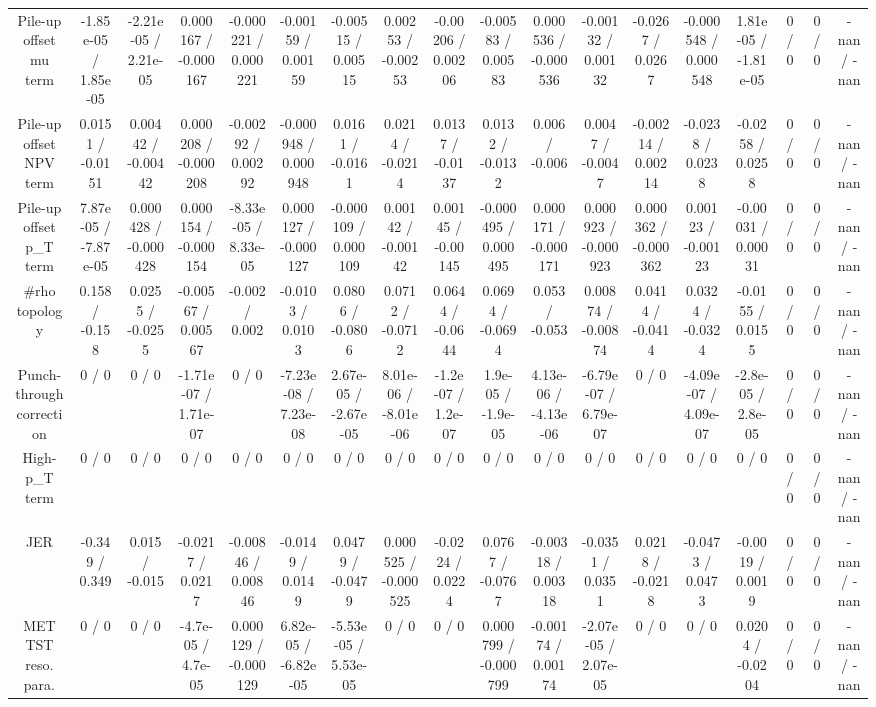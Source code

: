 \documentclass[10pt]{article}
\begin{document}
\begin{table}[htbp]
\begin{center}
\begin{tabular}{|c|c|c|c|c|c|c|c|c|c|c|c|c|c|c|c|c|c|}
  Pile-up offset mu term & -1.85e-05 / 1.85e-05 & -2.21e-05 / 2.21e-05 & 0.000167 / -0.000167 & -0.000221 / 0.000221 & -0.00159 / 0.00159 & -0.00515 / 0.00515 & 0.00253 / -0.00253 & -0.00206 / 0.00206 & -0.00583 / 0.00583 & 0.000536 / -0.000536 & -0.00132 / 0.00132 & -0.0267 / 0.0267 & -0.000548 / 0.000548 & 1.81e-05 / -1.81e-05 & 0 / 0 & 0 / 0 & -nan / -nan \\ 
  Pile-up offset NPV term & 0.0151 / -0.0151 & 0.00442 / -0.00442 & 0.000208 / -0.000208 & -0.00292 / 0.00292 & -0.000948 / 0.000948 & 0.0161 / -0.0161 & 0.0214 / -0.0214 & 0.0137 / -0.0137 & 0.0132 / -0.0132 & 0.006 / -0.006 & 0.0047 / -0.0047 & -0.00214 / 0.00214 & -0.0238 / 0.0238 & -0.0258 / 0.0258 & 0 / 0 & 0 / 0 & -nan / -nan \\ 
  Pile-up offset p_{T} term & 7.87e-05 / -7.87e-05 & 0.000428 / -0.000428 & 0.000154 / -0.000154 & -8.33e-05 / 8.33e-05 & 0.000127 / -0.000127 & -0.000109 / 0.000109 & 0.00142 / -0.00142 & 0.00145 / -0.00145 & -0.000495 / 0.000495 & 0.000171 / -0.000171 & 0.000923 / -0.000923 & 0.000362 / -0.000362 & 0.00123 / -0.00123 & -0.00031 / 0.00031 & 0 / 0 & 0 / 0 & -nan / -nan \\ 
  #rho topology & 0.158 / -0.158 & 0.0255 / -0.0255 & -0.00567 / 0.00567 & -0.002 / 0.002 & -0.0103 / 0.0103 & 0.0806 / -0.0806 & 0.0712 / -0.0712 & 0.0644 / -0.0644 & 0.0694 / -0.0694 & 0.053 / -0.053 & 0.00874 / -0.00874 & 0.0414 / -0.0414 & 0.0324 / -0.0324 & -0.0155 / 0.0155 & 0 / 0 & 0 / 0 & -nan / -nan \\ 
  Punch-through correction & 0 / 0 & 0 / 0 & -1.71e-07 / 1.71e-07 & 0 / 0 & -7.23e-08 / 7.23e-08 & 2.67e-05 / -2.67e-05 & 8.01e-06 / -8.01e-06 & -1.2e-07 / 1.2e-07 & 1.9e-05 / -1.9e-05 & 4.13e-06 / -4.13e-06 & -6.79e-07 / 6.79e-07 & 0 / 0 & -4.09e-07 / 4.09e-07 & -2.8e-05 / 2.8e-05 & 0 / 0 & 0 / 0 & -nan / -nan \\ 
  High-p_{T} term & 0 / 0 & 0 / 0 & 0 / 0 & 0 / 0 & 0 / 0 & 0 / 0 & 0 / 0 & 0 / 0 & 0 / 0 & 0 / 0 & 0 / 0 & 0 / 0 & 0 / 0 & 0 / 0 & 0 / 0 & 0 / 0 & -nan / -nan \\ 
  JER & -0.349 / 0.349 & 0.015 / -0.015 & -0.0217 / 0.0217 & -0.00846 / 0.00846 & -0.0149 / 0.0149 & 0.0479 / -0.0479 & 0.000525 / -0.000525 & -0.0224 / 0.0224 & 0.0767 / -0.0767 & -0.00318 / 0.00318 & -0.0351 / 0.0351 & 0.0218 / -0.0218 & -0.0473 / 0.0473 & -0.0019 / 0.0019 & 0 / 0 & 0 / 0 & -nan / -nan \\ 
  MET TST reso. para. & 0 / 0 & 0 / 0 & -4.7e-05 / 4.7e-05 & 0.000129 / -0.000129 & 6.82e-05 / -6.82e-05 & -5.53e-05 / 5.53e-05 & 0 / 0 & 0 / 0 & 0.000799 / -0.000799 & -0.00174 / 0.00174 & -2.07e-05 / 2.07e-05 & 0 / 0 & 0 / 0 & 0.0204 / -0.0204 & 0 / 0 & 0 / 0 & -nan / -nan \\ 

\end{tabular}
\end{center}
\end{table}
\end{document}
